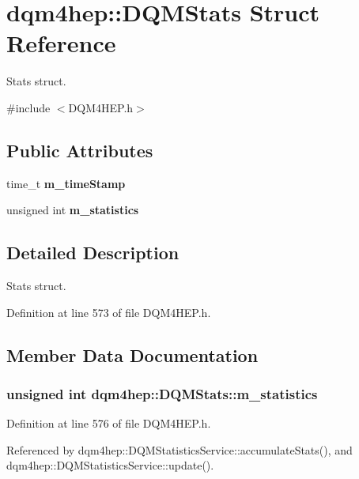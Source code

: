 \section{dqm4hep\+:\+:D\+Q\+M\+Stats Struct Reference}
\label{structdqm4hep_1_1DQMStats}


Stats struct.  




{\ttfamily \#include $<$D\+Q\+M4\+H\+E\+P.\+h$>$}

\subsection*{Public Attributes}
\begin{DoxyCompactItemize}
\item 
time\+\_\+t {\bf m\+\_\+time\+Stamp}
\item 
unsigned int {\bf m\+\_\+statistics}
\end{DoxyCompactItemize}


\subsection{Detailed Description}
Stats struct. 

Definition at line 573 of file D\+Q\+M4\+H\+E\+P.\+h.



\subsection{Member Data Documentation}
\subsubsection[{m\+\_\+statistics}]{\setlength{\rightskip}{0pt plus 5cm}unsigned int dqm4hep\+::\+D\+Q\+M\+Stats\+::m\+\_\+statistics}\label{structdqm4hep_1_1DQMStats_a80956aa6babd448d7cfb518c36f63498}


Definition at line 576 of file D\+Q\+M4\+H\+E\+P.\+h.



Referenced by dqm4hep\+::\+D\+Q\+M\+Statistics\+Service\+::accumulate\+Stats(), and dqm4hep\+::\+D\+Q\+M\+Statistics\+Service\+::update().

